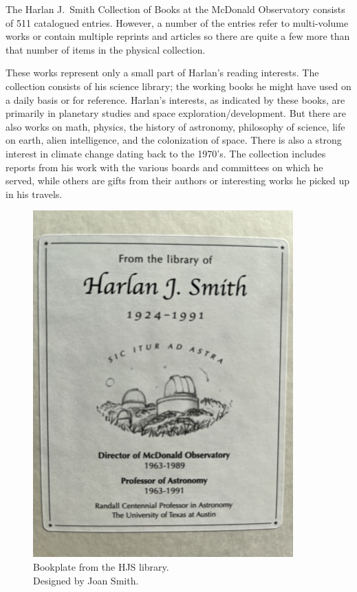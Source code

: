 

The Harlan J.~Smith Collection of Books at the McDonald Observatory
consists of 511 catalogued entries. However, a number of the entries
refer to multi-volume works or contain multiple reprints and articles
so there are quite a few more than that number of items in the
physical collection.

These works represent only a small part of Harlan's reading
interests.  The collection consists of his science library;
the working books he might have used on a daily basis or for
reference.  Harlan's interests, as indicated by these books, are
primarily in planetary studies and space exploration/development. But
there are also works on math, physics, the history of astronomy,
philosophy of science, life on earth, alien intelligence, and the
colonization of space. There is also a strong interest in climate
change dating back to the 1970's.  The collection includes reports
from his work with the various boards and committees on which he
served, while others are gifts from their authors or interesting
works he picked up in his travels.

\begin{figure}
  \centering
  \includegraphics[height=0.34\textheight]{hjs_bookplate_small.png}\\
  {\small Bookplate from the HJS library.\\Designed by Joan Smith.}
  \label{fig:bookplate}
\end{figure}

